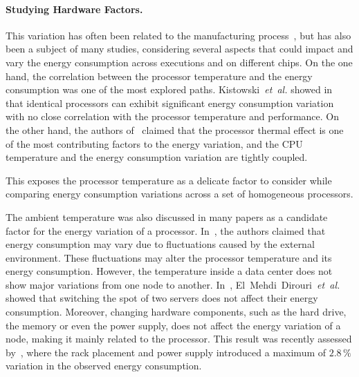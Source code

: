 

\paragraph{Studying Hardware Factors.}
This variation has often been related to the manufacturing process~\cite{coles_comparing_2014}, but has also been a subject of many studies, considering several aspects that could impact and vary the energy consumption across executions and on different chips.
On the one hand, the correlation between the processor temperature and the energy consumption was one of the most explored paths.
Kistowski~\emph{et~al.} showed in~\cite{joakim_v_kisroski_variations_2016} that identical processors can exhibit significant energy consumption variation with no close correlation with the processor temperature and performance.
On the other hand, the authors of~\cite{wang_potential_2018} claimed that the processor thermal effect is one of the most contributing factors to the energy variation, and the CPU temperature and the energy consumption variation are tightly coupled.


This exposes the processor temperature as a delicate factor to consider while comparing energy consumption variations across a set of homogeneous processors.%

The ambient temperature was also discussed in many papers as a candidate factor for the energy variation of a processor.
In~\cite{ranka_energy_2009}, the authors claimed that energy consumption may vary due to fluctuations caused by the external environment.
These fluctuations may alter the processor temperature and its energy consumption.
However, the temperature inside a data center does not show major variations from one node to another.
In~\cite{el_mehdi_diouri_your_2013}, El~Mehdi~Dirouri~\emph{et~al.} showed that switching the spot of two servers does not affect their energy consumption.
Moreover, changing hardware components, such as the hard drive, the memory or even the power supply, does not affect the energy variation of a node, making it mainly related to the processor.
This result was recently assessed by~\cite{wang_potential_2018}, where the rack placement and power supply introduced a maximum of $2.8\,\%$ variation in the observed energy consumption.

